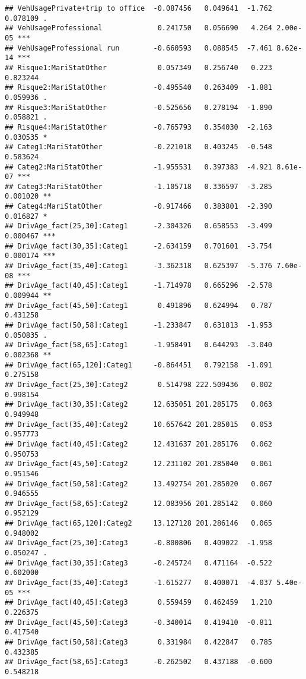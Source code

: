 \documentclass[
]{article}
\begin{document}
\begin{verbatim}
## VehUsagePrivate+trip to office  -0.087456   0.049641  -1.762 0.078109 .  
## VehUsageProfessional             0.241750   0.056690   4.264 2.00e-05 ***
## VehUsageProfessional run        -0.660593   0.088545  -7.461 8.62e-14 ***
## Risque1:MariStatOther            0.057349   0.256740   0.223 0.823244    
## Risque2:MariStatOther           -0.495540   0.263409  -1.881 0.059936 .  
## Risque3:MariStatOther           -0.525656   0.278194  -1.890 0.058821 .  
## Risque4:MariStatOther           -0.765793   0.354030  -2.163 0.030535 *  
## Categ1:MariStatOther            -0.221018   0.403245  -0.548 0.583624    
## Categ2:MariStatOther            -1.955531   0.397383  -4.921 8.61e-07 ***
## Categ3:MariStatOther            -1.105718   0.336597  -3.285 0.001020 ** 
## Categ4:MariStatOther            -0.917466   0.383801  -2.390 0.016827 *  
## DrivAge_fact(25,30]:Categ1      -2.304326   0.658553  -3.499 0.000467 ***
## DrivAge_fact(30,35]:Categ1      -2.634159   0.701601  -3.754 0.000174 ***
## DrivAge_fact(35,40]:Categ1      -3.362318   0.625397  -5.376 7.60e-08 ***
## DrivAge_fact(40,45]:Categ1      -1.714978   0.665296  -2.578 0.009944 ** 
## DrivAge_fact(45,50]:Categ1       0.491896   0.624994   0.787 0.431258    
## DrivAge_fact(50,58]:Categ1      -1.233847   0.631813  -1.953 0.050835 .  
## DrivAge_fact(58,65]:Categ1      -1.958491   0.644293  -3.040 0.002368 ** 
## DrivAge_fact(65,120]:Categ1     -0.864451   0.792158  -1.091 0.275158    
## DrivAge_fact(25,30]:Categ2       0.514798 222.509436   0.002 0.998154    
## DrivAge_fact(30,35]:Categ2      12.635051 201.285175   0.063 0.949948    
## DrivAge_fact(35,40]:Categ2      10.657642 201.285015   0.053 0.957773    
## DrivAge_fact(40,45]:Categ2      12.431637 201.285176   0.062 0.950753    
## DrivAge_fact(45,50]:Categ2      12.231102 201.285040   0.061 0.951546    
## DrivAge_fact(50,58]:Categ2      13.492754 201.285020   0.067 0.946555    
## DrivAge_fact(58,65]:Categ2      12.083956 201.285142   0.060 0.952129    
## DrivAge_fact(65,120]:Categ2     13.127128 201.286146   0.065 0.948002    
## DrivAge_fact(25,30]:Categ3      -0.800806   0.409022  -1.958 0.050247 .  
## DrivAge_fact(30,35]:Categ3      -0.245724   0.471164  -0.522 0.602000    
## DrivAge_fact(35,40]:Categ3      -1.615277   0.400071  -4.037 5.40e-05 ***
## DrivAge_fact(40,45]:Categ3       0.559459   0.462459   1.210 0.226375    
## DrivAge_fact(45,50]:Categ3      -0.340014   0.419410  -0.811 0.417540    
## DrivAge_fact(50,58]:Categ3       0.331984   0.422847   0.785 0.432385    
## DrivAge_fact(58,65]:Categ3      -0.262502   0.437188  -0.600 0.548218    

\end{verbatim}
\end{document}
